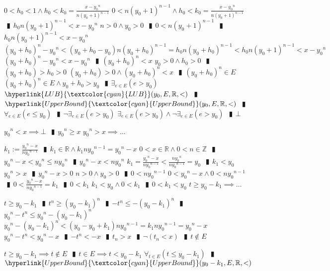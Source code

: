 \documentclass{book}
\newcommand{\rf}[1]{\hyperlink{#1}{\textcolor{cyan}{#1}}}
\newcommand{\abr}{:=}
\newcommand{\pipe}{$\phantom{(}\vrectangleblack\phantom{)}$}
\begin{document}
\begin{enumerate}
\begin{enumerate}
\begin{enumerate}
      \lit $0 < h_0 < 1 \land h_0 < k_0 = \frac{x - {y_0}^n}{n (y_0 + 1)^{n - 1}}$
      \lit $0 < n (y_0 + 1)^{n - 1} \land h_0 < k_0 = \frac{x - {y_0}^n}{n (y_0 + 1)^{n - 1}}$ \pipe $h_0 n (y_0 + 1)^{n - 1} < x - {y_0}^n$
      \lit $n > 0 \land y_0 > 0$ \pipe $0 < n (y_0 + 1)^{n - 1}$ \pipe $h_0 n (y_0 + 1)^{n - 1} < x - {y_0}^n$
      \lit $(y_0 + h_0)^n - {y_0}^n < (y_0 + h_0 - y_0) n (y_0 + h_0)^{n - 1} = h_0 n (y_0 + h_0)^{n - 1} < h_0 n (y_0 + 1)^{n - 1} < x - {y_0}^n$
      \lit $(y_0 + h_0)^n - {y_0}^n < x - {y_0}^n$ \pipe $(y_0 + h_0)^n < x$
      \lit $y_0 > 0 \land h_0 > 0$ \pipe $(y_0 + h_0) > h_0 > 0$
      \lit $(y_0 + h_0) > 0 \land (y_0 + h_0)^n < x$ \pipe $(y_0 + h_0)^n \in E$
      \lit $(y_0 + h_0)^n \in E \land y_0 + h_0 > y_0$ \pipe $\exists_{e \in E}(e > y_0)$
      \lit $\rf{LUB}(y_0, E, \mathbb{R}, <)$ \pipe $\rf{UpperBound}(y_0, E, \mathbb{R}, <)$ \pipe $\forall_{e \in E}(e \leq y_0)$ \pipe $\lnot \exists_{e \in E}(e > y_0)$
      \lit $\exists_{e \in E}(e > y_0) \land \lnot \exists_{e \in E}(e > y_0)$ \pipe $\bot$
    \end{enumerate}
    \lit ${y_0}^n < x \implies \bot$ \pipe ${y_0}^n \geq x$
    \lit ${y_0}^n > x \implies \ldots$
    \begin{enumerate}
      \lit $k_1 \abr \frac{{y_0}^n - x}{n {y_0}^{n - 1}}$ \pipe $k_1 \in \mathbb{R} \land k_1 n {y_0}^{n - 1} = {y_0}^n - x$
      \lit $0 < x \in \mathbb{R} \land 0 < n \in \mathbb{Z}$ \pipe ${y_0}^n - x < {y_0}^n \leq n {y_0}^n$ \pipe ${y_0}^n - x < n {y_0}^n$
      \lit $k_1 = \frac{{y_0}^n - x}{n {y_0}^{n - 1}} < \frac{n {y_0}^n}{n {y_0}^{n - 1}} = y_0$ \pipe $k_1 < y_0$
      \lit ${y_0}^n > x$ \pipe ${y_0}^n - x > 0$
      \lit $n > 0 \land y_0 > 0$ \pipe $0 < n {y_0}^{n - 1}$
      \lit $0 < {y_0}^n - x \land 0 < n {y_0}^{n - 1}$ \pipe $0 < \frac{{y_0}^n - x}{n {y_0}^{n - 1}} = k_1$ \pipe $0 < k_1$
      \lit $k_1 < y_0 \land 0 < k_1$ \pipe $0 < k_1 < y_0$
      \lit $t \geq y_0 - k_1 \implies \ldots$
      \begin{enumerate}
        \lit $t \geq y_0 - k_1$ \pipe $t^n \geq (y_0 - k_1)^n$ \pipe $-t^n \leq -(y_0 - k_1)^n$ \pipe ${y_0}^n - t^n \leq {y_0}^n - (y_0 - k_1)^n$
        \lit ${y_0}^n - (y_0 - k_1)^n < (y_0 - y_0 + k_1) n {y_0}^{n - 1} = k_1 n {y_0}^{n - 1} = {y_0}^n - x$
        \lit ${y_0}^n - t^n < {y_0}^n - x$ \pipe $-t^n < -x$ \pipe $t_n > x$ \pipe $\lnot(t_n < x)$ \pipe $t \notin E$
      \end{enumerate}
      \lit $t \geq y_0 - k_1 \implies t \notin E$ \pipe $t \in E \implies t < y_0 - k_1$
      \lit $\forall_{t \in E}(t \leq y_0 - k_1)$ \pipe $\rf{UpperBound}(y_0 - k_1, E, \mathbb{R}, <)$

\end{enumerate}
\end{enumerate}
\end{enumerate}
\end{document}
